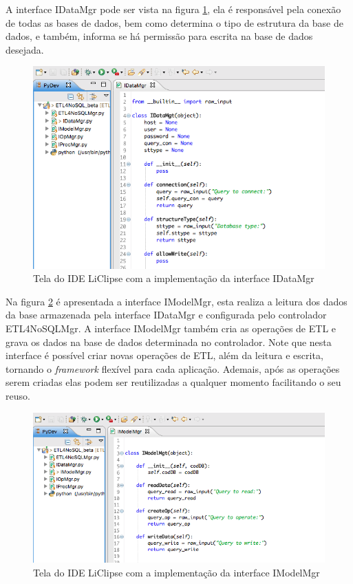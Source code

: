 A interface IDataMgr pode ser vista na figura \ref{idatamgr}, ela é responsável pela conexão de todas as bases de dados, bem como determina o tipo de estrutura da base de dados, e também, informa se há permissão para escrita na base de dados desejada.

\begin{figure}[h!]
	\centering
	\includegraphics[scale=0.7]{fig/idatamgr.png}
	\caption{Tela do IDE LiClipse com a implementação da interface IDataMgr}
	\label{idatamgr}
\end{figure}

Na figura \ref{imodelmgr} é apresentada a interface IModelMgr, esta realiza a leitura dos dados da base armazenada pela interface IDataMgr e configurada pelo controlador ETL4NoSQLMgr. A interface IModelMgr também cria as operações de ETL e grava os dados na base de dados determinada no controlador. Note que nesta interface é possível criar novas operações de ETL, além da leitura e escrita, tornando o \textit{framework} flexível para cada aplicação. Ademais, após as operações serem criadas elas podem ser reutilizadas a qualquer momento facilitando o seu reuso.

\begin{figure}[h!]
	\centering
	\includegraphics[scale=0.6]{fig/imodelmgr.png}
	\caption{Tela do IDE LiClipse com a implementação da interface IModelMgr}
	\label{imodelmgr}
\end{figure}

